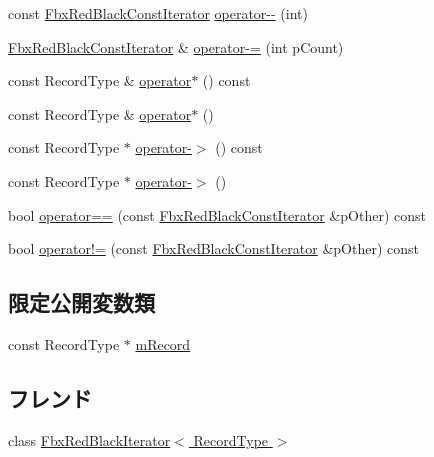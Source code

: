 \begin{DoxyCompactItemize}
\item 
const \hyperlink{class_fbx_red_black_const_iterator}{Fbx\+Red\+Black\+Const\+Iterator} \hyperlink{class_fbx_red_black_const_iterator_a1adca987fe31d11713b227487cccc6a4}{operator-\/-\/} (int)
\item 
\hyperlink{class_fbx_red_black_const_iterator}{Fbx\+Red\+Black\+Const\+Iterator} \& \hyperlink{class_fbx_red_black_const_iterator_a8d6e308711ba1c94309dd7f9efde946d}{operator-\/=} (int p\+Count)
\item 
const Record\+Type \& \hyperlink{class_fbx_red_black_const_iterator_a05c5d03970d6df3d9df410a71ed6ca7b}{operator$\ast$} () const
\item 
const Record\+Type \& \hyperlink{class_fbx_red_black_const_iterator_aeb755cf6e44025b6ea8544e4b59588a6}{operator$\ast$} ()
\item 
const Record\+Type $\ast$ \hyperlink{class_fbx_red_black_const_iterator_add2e613de14418803884f3b8318d35a1}{operator-\/$>$} () const
\item 
const Record\+Type $\ast$ \hyperlink{class_fbx_red_black_const_iterator_a2e6a8544f7e725eb401ee6cde016c677}{operator-\/$>$} ()
\item 
bool \hyperlink{class_fbx_red_black_const_iterator_a542202e140ed1247bf5af93fdbf09de9}{operator==} (const \hyperlink{class_fbx_red_black_const_iterator}{Fbx\+Red\+Black\+Const\+Iterator} \&p\+Other) const
\item 
bool \hyperlink{class_fbx_red_black_const_iterator_a5fbf14933b61dbef1aee3aff44b9ad2c}{operator!=} (const \hyperlink{class_fbx_red_black_const_iterator}{Fbx\+Red\+Black\+Const\+Iterator} \&p\+Other) const
\end{DoxyCompactItemize}
\subsection*{限定公開変数類}
\begin{DoxyCompactItemize}
\item 
const Record\+Type $\ast$ \hyperlink{class_fbx_red_black_const_iterator_a81e85ea2f1580a368b2352a72295dd06}{m\+Record}
\end{DoxyCompactItemize}
\subsection*{フレンド}
\begin{DoxyCompactItemize}
\item 
class \hyperlink{class_fbx_red_black_const_iterator_a8615cd7fe43a76938283f1ddbe4f8b9b}{Fbx\+Red\+Black\+Iterator$<$ Record\+Type $>$}
\end{DoxyCompactItemize}


